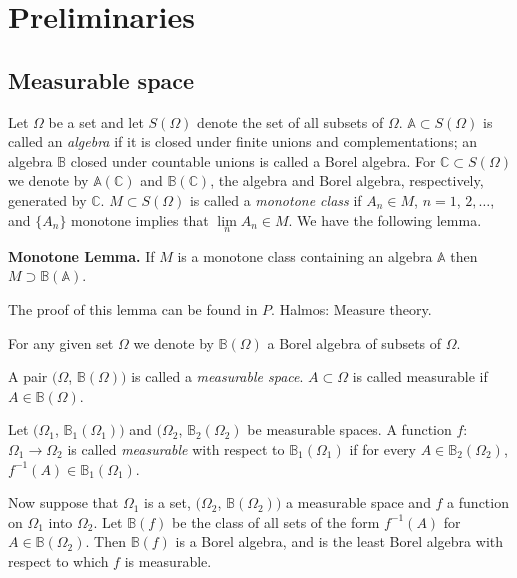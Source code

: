 \setcounter{chapter}{-1}
\chapter{Preliminaries} %

\section{Measurable space}\pageoriginale\label{chap0-sec1} 

Let $\Omega$ be a set and let $S(\Omega)$ denote the set of all
subsets of $\Omega$. $\mathbb{A} \subset S(\Omega)$ is called an
\textit{algebra} if it is closed under finite unions and
complementations; an algebra
$\mathbb{B}$ closed under countable unions is called a Borel
algebra. For $\mathbb{C} \subset S(\Omega)$ we denote by
$\mathbb{A}(\mathbb{C})$ and $\mathbb{B} (\mathbb{C})$, the algebra
and Borel algebra, respectively, generated by $\mathbb{C}$. $M \subset
S(\Omega)$ is called a \textit{monotone class} if $A_n \in M$, $n=
1$, $2,\ldots$, and $\{ A_n \}$ monotone implies that $\lim \limits_n
A_n \in M$. We have the following lemma. 

\medskip

\noindent \textbf{Monotone Lemma.}
 If $M$ is a monotone class containing an algebra $\mathbb{A}$ then $M
 \supset \mathbb{B} (\mathbb{A})$.  

 
The proof of this lemma can be found in $P$. Halmos: Measure theory. 

For any given set $\Omega$ we denote by $\mathbb{B} (\Omega)$ a Borel
algebra of subsets of $\Omega$. 
\begin{defi*}
  A pair $(\Omega$, $ \mathbb{B} (\Omega))$ is called a 
\textit{measurable space}. $A \subset \Omega$ is called measurable if $A
  \in \mathbb{B} (\Omega)$. 
\end{defi*}

Let $(\Omega_1$, $ \mathbb{B}_1 (\Omega_1))$ and $(\Omega_2$, $
\mathbb{B}_2 (\Omega_2)$ be measurable spaces. A function $f$:
$\Omega_1 \to \Omega_2$ is called \textit{measurable} with respect
to $\mathbb{B}_1 (\Omega_1)$ if for every $A \in
\mathbb{B}_2(\Omega_2)$, $ f^{-1}(A) \in \mathbb{B}_1 (\Omega_1)$. 

Now suppose that $\Omega_1$ is a set, $(\Omega_2$, $ \mathbb{B}
(\Omega_2))$ a measurable space and $f$ a function on $\Omega_1$ into
$\Omega_2$. Let $\mathbb{B}(f)$ be the class\pageoriginale 
of all sets of the form
$f^{-1}(A)$ for $A \in \mathbb{B} (\Omega_2)$. Then $\mathbb{B}(f)$ is
a Borel algebra, and is the least Borel algebra with respect to which
$f$ is measurable.  

